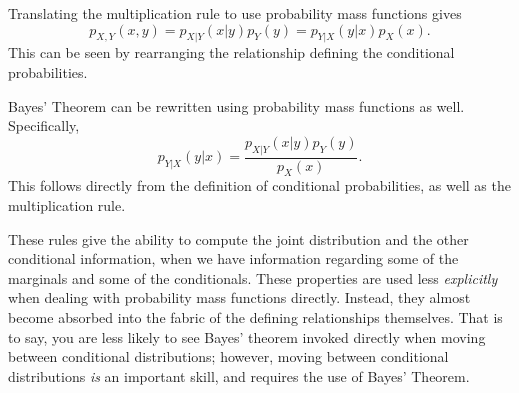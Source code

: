 \documentclass[
  letterpaper,
  DIV=11,
  numbers=noendperiod]{scrreprt}
\theoremstyle{definition}
\theoremstyle{definition}
\theoremstyle{definition}
\theoremstyle{remark}
\begin{document}
\begin{tcolorbox}[enhanced jigsaw, rightrule=.15mm, leftrule=.75mm, opacitybacktitle=0.6, title={Multiplication Rule (with Probability Mass Functions)}, colframe=quarto-callout-tip-color-frame, opacityback=0, coltitle=black, breakable, toptitle=1mm, colbacktitle=quarto-callout-tip-color!10!white, bottomtitle=1mm, titlerule=0mm, arc=.35mm, colback=white, toprule=.15mm, left=2mm, bottomrule=.15mm]

Translating the multiplication rule to use probability mass functions
gives \[p_{X,Y}(x,y) = p_{X|Y}(x|y)p_Y(y) = p_{Y|X}(y|x)p_X(x).\] This
can be seen by rearranging the relationship defining the conditional
probabilities.

\end{tcolorbox}

\begin{tcolorbox}[enhanced jigsaw, rightrule=.15mm, leftrule=.75mm, opacitybacktitle=0.6, title={Bayes' Theorem (with Probability Mass Functions)}, colframe=quarto-callout-tip-color-frame, opacityback=0, coltitle=black, breakable, toptitle=1mm, colbacktitle=quarto-callout-tip-color!10!white, bottomtitle=1mm, titlerule=0mm, arc=.35mm, colback=white, toprule=.15mm, left=2mm, bottomrule=.15mm]

Bayes' Theorem can be rewritten using probability mass functions as
well. Specifically,
\[p_{Y|X}(y|x) = \frac{p_{X|Y}(x|y)p_Y(y)}{p_X(x)}.\] This follows
directly from the definition of conditional probabilities, as well as
the multiplication rule.

\end{tcolorbox}

These rules give the ability to compute the joint distribution and the
other conditional information, when we have information regarding some
of the marginals and some of the conditionals. These properties are used
less \emph{explicitly} when dealing with probability mass functions
directly. Instead, they almost become absorbed into the fabric of the
defining relationships themselves. That is to say, you are less likely
to see Bayes' theorem invoked directly when moving between conditional
distributions; however, moving between conditional distributions
\emph{is} an important skill, and requires the use of Bayes' Theorem.
\end{document}
